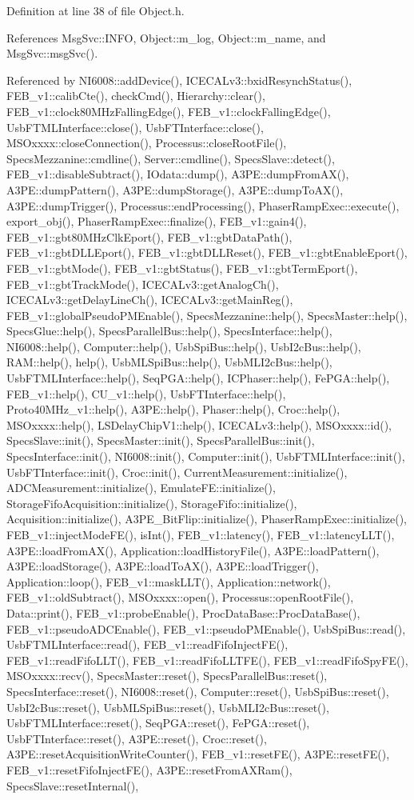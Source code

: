 Definition at line 38 of file Object.h.

References MsgSvc::INFO, Object::m\_\-log, Object::m\_\-name, and MsgSvc::msgSvc().

Referenced by NI6008::addDevice(), ICECALv3::bxidResynchStatus(), FEB\_\-v1::calibCte(), checkCmd(), Hierarchy::clear(), FEB\_\-v1::clock80MHzFallingEdge(), FEB\_\-v1::clockFallingEdge(), UsbFTMLInterface::close(), UsbFTInterface::close(), MSOxxxx::closeConnection(), Processus::closeRootFile(), SpecsMezzanine::cmdline(), Server::cmdline(), SpecsSlave::detect(), FEB\_\-v1::disableSubtract(), IOdata::dump(), A3PE::dumpFromAX(), A3PE::dumpPattern(), A3PE::dumpStorage(), A3PE::dumpToAX(), A3PE::dumpTrigger(), Processus::endProcessing(), PhaserRampExec::execute(), export\_\-obj(), PhaserRampExec::finalize(), FEB\_\-v1::gain4(), FEB\_\-v1::gbt80MHzClkEport(), FEB\_\-v1::gbtDataPath(), FEB\_\-v1::gbtDLLEport(), FEB\_\-v1::gbtDLLReset(), FEB\_\-v1::gbtEnableEport(), FEB\_\-v1::gbtMode(), FEB\_\-v1::gbtStatus(), FEB\_\-v1::gbtTermEport(), FEB\_\-v1::gbtTrackMode(), ICECALv3::getAnalogCh(), ICECALv3::getDelayLineCh(), ICECALv3::getMainReg(), FEB\_\-v1::globalPseudoPMEnable(), SpecsMezzanine::help(), SpecsMaster::help(), SpecsGlue::help(), SpecsParallelBus::help(), SpecsInterface::help(), NI6008::help(), Computer::help(), UsbSpiBus::help(), UsbI2cBus::help(), RAM::help(), help(), UsbMLSpiBus::help(), UsbMLI2cBus::help(), UsbFTMLInterface::help(), SeqPGA::help(), ICPhaser::help(), FePGA::help(), FEB\_\-v1::help(), CU\_\-v1::help(), UsbFTInterface::help(), Proto40MHz\_\-v1::help(), A3PE::help(), Phaser::help(), Croc::help(), MSOxxxx::help(), LSDelayChipV1::help(), ICECALv3::help(), MSOxxxx::id(), SpecsSlave::init(), SpecsMaster::init(), SpecsParallelBus::init(), SpecsInterface::init(), NI6008::init(), Computer::init(), UsbFTMLInterface::init(), UsbFTInterface::init(), Croc::init(), CurrentMeasurement::initialize(), ADCMeasurement::initialize(), EmulateFE::initialize(), StorageFifoAcquisition::initialize(), StorageFifo::initialize(), Acquisition::initialize(), A3PE\_\-BitFlip::initialize(), PhaserRampExec::initialize(), FEB\_\-v1::injectModeFE(), isInt(), FEB\_\-v1::latency(), FEB\_\-v1::latencyLLT(), A3PE::loadFromAX(), Application::loadHistoryFile(), A3PE::loadPattern(), A3PE::loadStorage(), A3PE::loadToAX(), A3PE::loadTrigger(), Application::loop(), FEB\_\-v1::maskLLT(), Application::network(), FEB\_\-v1::oldSubtract(), MSOxxxx::open(), Processus::openRootFile(), Data::print(), FEB\_\-v1::probeEnable(), ProcDataBase::ProcDataBase(), FEB\_\-v1::pseudoADCEnable(), FEB\_\-v1::pseudoPMEnable(), UsbSpiBus::read(), UsbFTMLInterface::read(), FEB\_\-v1::readFifoInjectFE(), FEB\_\-v1::readFifoLLT(), FEB\_\-v1::readFifoLLTFE(), FEB\_\-v1::readFifoSpyFE(), MSOxxxx::recv(), SpecsMaster::reset(), SpecsParallelBus::reset(), SpecsInterface::reset(), NI6008::reset(), Computer::reset(), UsbSpiBus::reset(), UsbI2cBus::reset(), UsbMLSpiBus::reset(), UsbMLI2cBus::reset(), UsbFTMLInterface::reset(), SeqPGA::reset(), FePGA::reset(), UsbFTInterface::reset(), A3PE::reset(), Croc::reset(), A3PE::resetAcquisitionWriteCounter(), FEB\_\-v1::resetFE(), A3PE::resetFE(), FEB\_\-v1::resetFifoInjectFE(), A3PE::resetFromAXRam(), SpecsSlave::resetInternal(), 